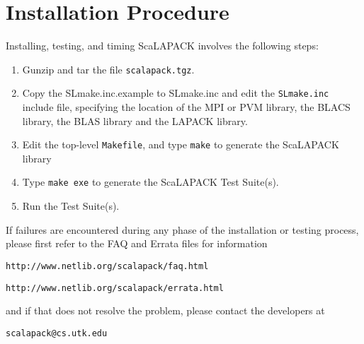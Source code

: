 \documentclass[11pt]{report}
\begin{document}
\section{Installation Procedure}\label{installation}

Installing, testing, and timing ScaLAPACK
involves the following steps: 
\begin{enumerate}
\item Gunzip and tar the file {\tt scalapack.tgz}.

\item Copy the SLmake.inc.example to SLmake.inc and edit 
      the {\tt SLmake.inc} include file, specifying the
      location of the MPI or PVM library, the BLACS library,
      the BLAS library and the LAPACK library.

\item Edit the top-level {\tt Makefile}, and type {\tt make}
      to generate the ScaLAPACK library 

\item Type {\tt make exe}
      to generate the ScaLAPACK Test Suite(s). 

\item Run the Test Suite(s).





\end{enumerate}

If failures are encountered during any phase of the installation or
testing process, please first refer to the FAQ and Errata files for
information
\begin{list}{}{}
\item {\tt http://www.netlib.org/scalapack/faq.html}
\item {\tt http://www.netlib.org/scalapack/errata.html}
\end{list}
and if that does not resolve the problem, please contact
the developers at
\begin{list}{}{}
\item {\tt scalapack@cs.utk.edu}
\end{list}
\end{document}
